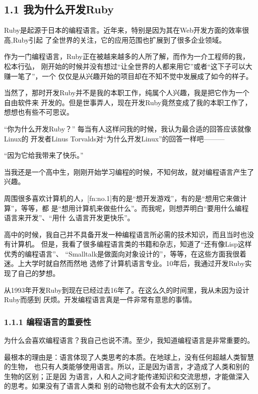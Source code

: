 \documentclass[11pt]{ctexart}
\begin{document}
\subsection{1.1 我为什么开发Ruby}
\label{sec:org6820857}

Ruby是起源于日本的编程语言。近年来，特别是因为其在Web开发方面的效率很高,Ruby引起
了全世界的关注，它的应用范围也扩展到了很多企业领域。

作为一门编程语言，Ruby正在被越来越多的人所了解，而作为一介工程师的我，松本行弘，
刚开始的时候并没有想过“让全世界的人都来用它”或者“这下子可以大赚一笔了”，一个
仅仅是从兴趣开始的项目却在不知不觉中发展成了如今的样子。

当然了，那时开发Ruby并不是我的本职工作，纯属个人兴趣，我是把它作为一个自由软件来
开发的。但是世事弄人，现在开发Ruby竟然变成了我的本职工作了，想想也有些不可思议。

“你为什么开发Ruby？” 每当有人这样问我的时候，我认为最合适的回答应该就像Linux的
开发者Linus Torvalds对“为什么开发Linux”的回答一样吧———

“因为它给我带来了快乐。”

当我还是一个高中生，刚刚开始学习编程的时候，不知何故，就对编程语言产生了兴趣。

周围很多喜欢计算机的人，[fn:no.1]有的是“想开发游戏”，有的是“想用它来做计算”，等等，都
是“想用计算机来做些什么”。而我呢，则想弄明白“要用什么编程语言来开发”、“用什
么语言开发更快乐”。

高中的时候，我自己并不具备开发一种编程语言所必需的技术知识，而且当时也没有计算机。
但是，我看了很多编程语言类的书籍和杂志，知道了“还有像Lisp这样优秀的编程语言”、
“Smalltalk是做面向对象设计的”，等等，在这些方面我很着迷。上大学时就自然而然地
选修了计算机语言专业。10年后，我通过开发Ruby实现了自己的梦想。

从1993年开发Ruby到现在已经过去16年了。在这么久的时间里，我从未因为设计Ruby而感到
厌烦。开发编程语言真是一件非常有意思的事情。

\subsubsection{1.1.1 编程语言的重要性}
\label{sec:org60cc5eb}

为什么会喜欢编程语言？我自己也说不清。至少，我知道编程语言是非常重要的。

最根本的理由是：语言体现了人类思考的本质。在地球上，没有任何超越人类智慧的生物，
也只有人类能够使用语言。所以，正是因为语言，才造成了人类和别的生物的区别；正是因
为语言，人和人之间才能传递知识和交流思想，才能做深入的思考。如果没有了语言人类和
别的动物也就不会有太大的区别了。
\end{document}
